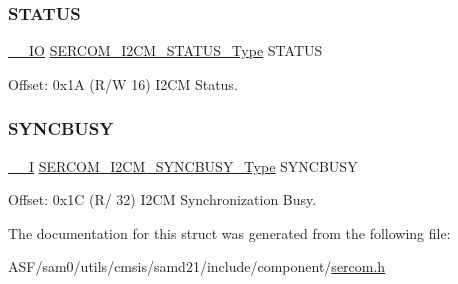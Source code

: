 \mbox{\label{struct_sercom_i2cm_a7c99708815eb51264100fe0081bed598}} 
\subsubsection{\texorpdfstring{STATUS}{STATUS}}
{\footnotesize\ttfamily \mbox{\hyperlink{core__cm0plus_8h_aec43007d9998a0a0e01faede4133d6be}{\+\_\+\+\_\+\+IO}} \mbox{\hyperlink{union_s_e_r_c_o_m___i2_c_m___s_t_a_t_u_s___type}{S\+E\+R\+C\+O\+M\+\_\+\+I2\+C\+M\+\_\+\+S\+T\+A\+T\+U\+S\+\_\+\+Type}} S\+T\+A\+T\+US}



Offset\+: 0x1A (R/W 16) I2\+CM Status. 

\mbox{\label{struct_sercom_i2cm_accbbe1aa136865ea8fe8c7ee46a1409c}} 
\subsubsection{\texorpdfstring{SYNCBUSY}{SYNCBUSY}}
{\footnotesize\ttfamily \mbox{\hyperlink{core__cm0plus_8h_af63697ed9952cc71e1225efe205f6cd3}{\+\_\+\+\_\+I}} \mbox{\hyperlink{union_s_e_r_c_o_m___i2_c_m___s_y_n_c_b_u_s_y___type}{S\+E\+R\+C\+O\+M\+\_\+\+I2\+C\+M\+\_\+\+S\+Y\+N\+C\+B\+U\+S\+Y\+\_\+\+Type}} S\+Y\+N\+C\+B\+U\+SY}



Offset\+: 0x1C (R/ 32) I2\+CM Synchronization Busy. 



The documentation for this struct was generated from the following file\+:\begin{DoxyCompactItemize}
\item 
A\+S\+F/sam0/utils/cmsis/samd21/include/component/\mbox{\hyperlink{utils_2cmsis_2samd21_2include_2component_2sercom_8h}{sercom.\+h}}\end{DoxyCompactItemize}
